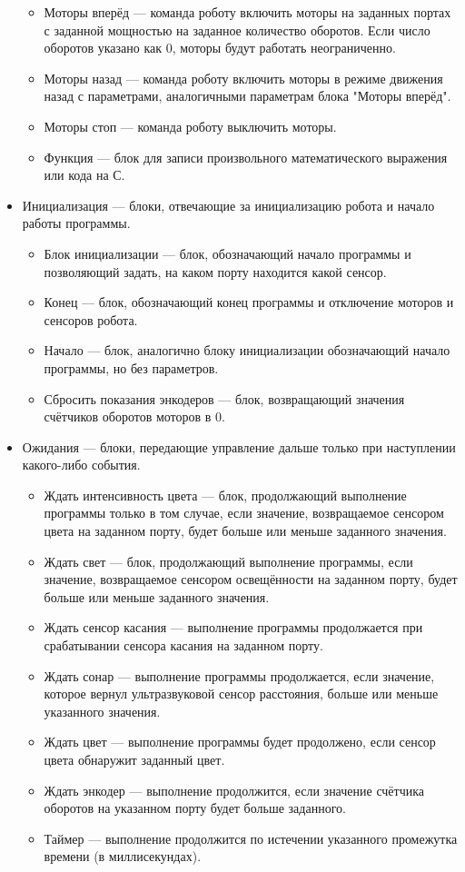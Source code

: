 \documentclass[a4paper]{article}
\begin{document}
\begin{itemize}
\begin{itemize}
    \item Моторы вперёд --- команда роботу включить моторы на заданных портах с заданной мощностью на заданное количество оборотов. Если число оборотов указано как 0, моторы будут работать неограниченно.
    \item Моторы назад --- команда роботу включить моторы в режиме движения назад с параметрами, аналогичными параметрам блока "Моторы вперёд".
    \item Моторы стоп --- команда роботу выключить моторы.
    \item Функция --- блок для записи произвольного математического выражения или кода на С.
  \end{itemize}
  \item Инициализация --- блоки, отвечающие за инициализацию робота и начало работы программы.
  \begin{itemize}
    \item Блок инициализации --- блок, обозначающий начало программы и позволяющий задать, на каком порту находится какой сенсор.
    \item Конец --- блок, обозначающий конец программы и отключение моторов и сенсоров робота.
    \item Начало --- блок, аналогично блоку инициализации обозначающий начало программы, но без параметров.
    \item Сбросить показания энкодеров --- блок, возвращающий значения счётчиков оборотов моторов в 0.
  \end{itemize}
  \item Ожидания --- блоки, передающие управление дальше только при наступлении какого-либо события.
  \begin{itemize}
    \item Ждать интенсивность цвета --- блок, продолжающий выполнение программы только в том случае, если значение, возвращаемое сенсором цвета на заданном порту, будет больше или меньше заданного значения.
    \item Ждать свет --- блок, продолжающий выполнение программы, если значение, возвращаемое сенсором освещённости на заданном порту, будет больше или меньше заданного значения.
    \item Ждать сенсор касания --- выполнение программы продолжается при срабатывании сенсора касания на заданном порту.
    \item Ждать сонар --- выполнение программы продолжается, если значение, которое вернул ультразвуковой сенсор расстояния, больше или меньше указанного значения.
    \item Ждать цвет --- выполнение программы будет продолжено, если сенсор цвета обнаружит заданный цвет.
    \item Ждать энкодер --- выполнение продолжится, если значение счётчика оборотов на указанном порту будет больше заданного.
    \item Таймер --- выполнение продолжится по истечении указанного промежутка времени (в миллисекундах).
  \end{itemize}
\end{itemize}
\end{document}
